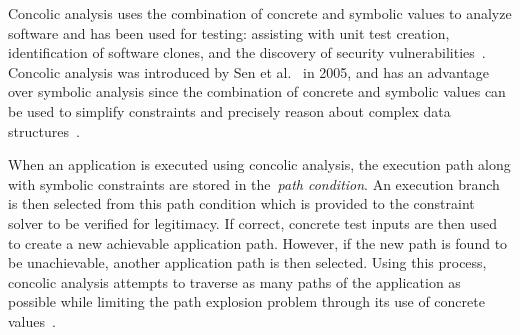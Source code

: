 \documentclass{sig-alternate}
\newcommand{\dan}[1]{\textcolor{blue}{{\it [Dan says: #1]}}}
\begin{document}


Concolic analysis uses the combination of concrete and symbolic values to analyze software and has been used for testing: assisting with unit test creation, identification of software clones, and the discovery of security vulnerabilities~\cite{Sen:2005:CCU:1081706.1081750, Godefroid_automatedwhitebox, 6671332, Krutz_Sac15}. Concolic analysis was introduced by Sen et al.~\cite{Sen:2005:CCU:1081706.1081750} in 2005, and has an advantage over symbolic analysis since the combination of concrete and symbolic values can be used to simplify constraints and precisely reason about complex data structures~\cite{4222603}.

When an application is executed using concolic analysis, the execution path along with symbolic constraints are stored in the~\emph{path condition}. An execution branch is then selected from this path condition which is provided to the constraint solver to be verified for legitimacy. If correct, concrete test inputs are then used to create a new achievable application path. However, if the new path is found to be unachievable, another application path is then selected. Using this process, concolic analysis attempts to traverse as many paths of the application as possible while limiting the path explosion problem through its use of concrete values~\cite{Jaffar:2013:BCT:2491411.2491425}.


\end{document}
